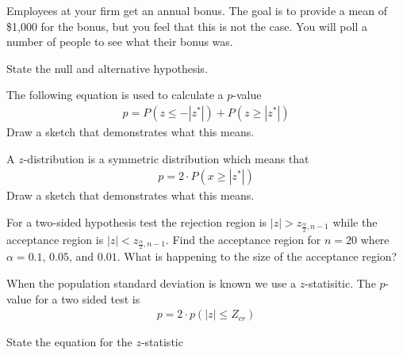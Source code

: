 \begin{problem}
\begin{subproblem}
    \vfill

  \end{subproblem}

\clearpage

\item Employees at your firm get an annual bonus. The goal is to
  provide a mean of \$1,000 for the bonus, but you feel that this is
  not the case. You will poll a number of people to see what their
  bonus was.

\begin{subproblem}
\item State the null and alternative hypothesis.
  \vspace*{2em}

\item The following equation is used to calculate a $p$-value
  \begin{eqnarray*}
    p = P(z \le -|z^*|) + P(z \ge |z^*|)
  \end{eqnarray*}
  Draw a sketch that demonstrates what this means.

  \vfill

\item A $z$-distribution is a symmetric distribution which means that
  \begin{eqnarray*}
    p = 2 \cdot  P(x \ge |z^*|)
  \end{eqnarray*}
  Draw a sketch that demonstrates what this means.

  \vfill



\item For a two-sided hypothesis test the rejection region is
  $|z| > z_{\frac{\alpha}{2},n-1}$ while the acceptance region is
  $|z| < z_{\frac{\alpha}{2},n-1}$.  Find the acceptance region for
  $n=20$ where $\alpha = 0.1$, $0.05$, and $0.01$. What is happening
  to the size of the acceptance region?

  \vfill

\end{subproblem}

\clearpage

\item When the population standard deviation is known we use a
  $z$-statisitic. The $p$-value for a two sided test is 
  \begin{eqnarray*}
    p = 2 \cdot p(|z|\leq Z_{cr} )
  \end{eqnarray*}
  \begin{subproblem}
  \item State the equation for the $z$-statistic
    \vfill


\end{subproblem}
\end{problem}

